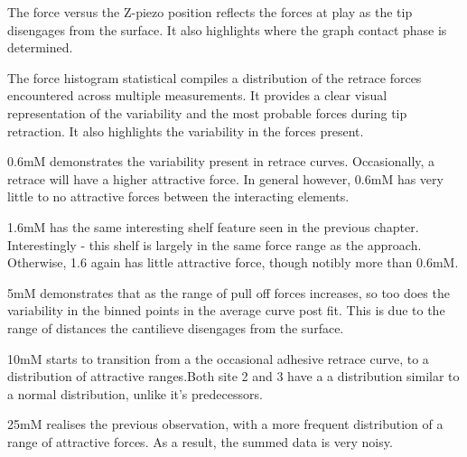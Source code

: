 The force versus the Z-piezo position reflects the forces at play as the tip disengages from the surface. It also highlights where the graph contact phase is determined.

The force histogram statistical compiles a distribution of the retrace forces encountered across multiple measurements. It provides a clear visual representation of the variability and the most probable forces during tip retraction. It also highlights the variability in the forces present.



0.6mM demonstrates the variability present in retrace curves. Occasionally, a retrace will have a higher attractive force. In general however, 0.6mM has very little to no attractive forces between the interacting elements.


1.6mM has the same interesting shelf feature seen in the previous chapter. Interestingly - this shelf is largely in the same force range as the approach. Otherwise, 1.6 again has little attractive force, though notibly more than 0.6mM.


5mM demonstrates that as the range of pull off forces increases, so too does the variability in the binned points in the average curve post fit. This is due to the range of distances the cantilieve disengages from the surface.


10mM starts to transition from a the occasional adhesive retrace curve, to a distribution of attractive ranges.Both site 2 and 3 have a a distribution similar to a normal distribution, unlike it's predecessors.


25mM realises the previous observation, with a more frequent distribution of a range of attractive forces. As a result, the summed data is very noisy.


